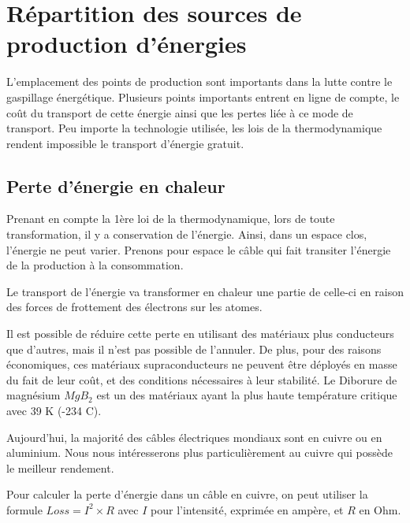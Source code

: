 \chapter{Répartition des sources de production d'énergies}

L'emplacement des points de production sont importants dans la lutte contre le gaspillage énergétique.
Plusieurs points importants entrent en ligne de compte, le coût du transport de cette énergie ainsi que les pertes liée à ce mode de transport.
Peu importe la technologie utilisée, les lois de la thermodynamique rendent impossible le transport d'énergie gratuit.

\section{Perte d'énergie en chaleur}

Prenant en compte la 1ère loi de la thermodynamique, lors de toute transformation, il y a
conservation de l'énergie.
Ainsi, dans un espace clos, l'énergie ne peut varier.
Prenons pour espace le câble qui fait transiter l'énergie de la production à la consommation.

Le transport de l'énergie va transformer en chaleur une partie de celle-ci en raison
des forces de frottement des électrons sur les atomes.

Il est possible de réduire cette perte en utilisant des matériaux plus conducteurs que
d'autres, mais il n'est pas possible de l'annuler.
De plus, pour des raisons économiques, ces matériaux supraconducteurs ne peuvent être
déployés en masse du fait de leur coût, et des conditions nécessaires à leur stabilité.
Le Diborure de magnésium $MgB_2$ est un des matériaux ayant la plus haute température
critique avec 39 K (-234 C).

Aujourd'hui, la majorité des câbles électriques mondiaux sont en cuivre ou en aluminium.
Nous nous intéresserons plus particulièrement au cuivre qui possède le meilleur rendement.

Pour calculer la perte d'énergie dans un câble en cuivre, on peut utiliser
la formule $Loss = I^2\times R$ avec $I$ pour l'intensité, exprimée en ampère, et $R$ en Ohm.

